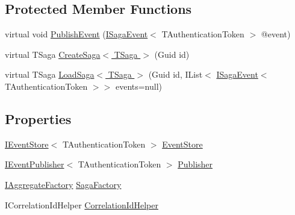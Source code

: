 \subsection*{Protected Member Functions}
\begin{DoxyCompactItemize}
\item 
virtual void \hyperlink{classCqrs_1_1Domain_1_1SagaRepository_a1dec03959e4d859c6cf2be0507b1bc05}{Publish\+Event} (\hyperlink{interfaceCqrs_1_1Events_1_1ISagaEvent}{I\+Saga\+Event}$<$ T\+Authentication\+Token $>$ @event)
\item 
virtual T\+Saga \hyperlink{classCqrs_1_1Domain_1_1SagaRepository_acb23e0bd3e5655547a13b4ad2b06e548}{Create\+Saga$<$ T\+Saga $>$} (Guid id)
\item 
virtual T\+Saga \hyperlink{classCqrs_1_1Domain_1_1SagaRepository_acc59a4478bb992b03690f0cda3e4e362}{Load\+Saga$<$ T\+Saga $>$} (Guid id, I\+List$<$ \hyperlink{interfaceCqrs_1_1Events_1_1ISagaEvent}{I\+Saga\+Event}$<$ T\+Authentication\+Token $>$$>$ events=null)
\end{DoxyCompactItemize}
\subsection*{Properties}
\begin{DoxyCompactItemize}
\item 
\hyperlink{interfaceCqrs_1_1Events_1_1IEventStore}{I\+Event\+Store}$<$ T\+Authentication\+Token $>$ \hyperlink{classCqrs_1_1Domain_1_1SagaRepository_a4b872f1a20660ece8ce1b54720193fda}{Event\+Store}
\item 
\hyperlink{interfaceCqrs_1_1Events_1_1IEventPublisher}{I\+Event\+Publisher}$<$ T\+Authentication\+Token $>$ \hyperlink{classCqrs_1_1Domain_1_1SagaRepository_a94707dc4549d096ea3cf5d241117495a}{Publisher}
\item 
\hyperlink{interfaceCqrs_1_1Domain_1_1Factories_1_1IAggregateFactory}{I\+Aggregate\+Factory} \hyperlink{classCqrs_1_1Domain_1_1SagaRepository_a578164fa38728f3a23ca41d8c81611e0}{Saga\+Factory}
\item 
I\+Correlation\+Id\+Helper \hyperlink{classCqrs_1_1Domain_1_1SagaRepository_a654f9f7c2130864d63515f1504a750fd}{Correlation\+Id\+Helper}
\end{DoxyCompactItemize}


